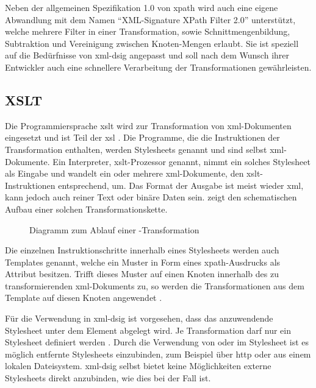 Neben der allgemeinen Spezifikation 1.0 von \gls{xpath} \cite{xpath:w3c} wird auch eine eigene Abwandlung mit dem Namen "`XML-Signature XPath Filter 2.0"'
\cite{xml-dsig-filter:w3c} unterstützt, welche mehrere Filter in einer Transformation, sowie Schnittmengenbildung, Subtraktion und Vereinigung zwischen
Knoten-Mengen erlaubt. Sie ist speziell auf die Bedürfnisse von \gls{xml-dsig} angepasst und soll nach dem Wunsch ihrer Entwickler auch eine schnellere
Verarbeitung der Transformationen gewährleisten.



\subsection{XSLT}
\label{sec:XML-DSig:Transformationen:XSLT}
Die Programmiersprache \gls{xslt} wird zur Transformation von \gls{xml}-Dokumenten eingesetzt und ist Teil der \gls{xsl} \cite{xml:oreilly}. Die Programme, die
die Instruktionen der Transformation enthalten, werden Stylesheets genannt und sind selbst \gls{xml}-Dokumente. Ein Interpreter, \gls{xslt}-Prozessor genannt,
nimmt ein solches Stylesheet als Eingabe und wandelt ein oder mehrere \gls{xml}-Dokumente, den \gls{xslt}-Instruktionen entsprechend, um. Das Format der Ausgabe ist
meist wieder \gls{xml}, kann jedoch auch reiner Text oder binäre Daten sein.  zeigt den schematischen Aufbau einer solchen
Transformationskette.

\begin{figure}
    \centering
    
    \caption{Diagramm zum Ablauf einer \texorpdfstring{\protect{}}{XSLT}-Transformation}
    \label{fig:xslt-processing}
\end{figure}

Die einzelnen Instruktionschritte innerhalb eines Stylesheets werden auch Templates genannt, welche ein Muster in Form eines \gls{xpath}-Ausdrucks als Attribut besitzen. 
Trifft dieses Muster auf einen Knoten innerhalb des zu transformierenden \gls{xml}-Dokuments zu, so werden die Transformationen  aus dem Template auf diesen Knoten 
angewendet \cite{xslt:w3c,xml:oreilly}.

Für die Verwendung in \gls{xml-dsig} ist vorgesehen, dass das anzuwendende Stylesheet unter dem Element  abgelegt wird.
Je Transformation darf nur ein Stylesheet definiert werden \cite{xml-dsig:w3c}. Durch die Verwendung von  oder  im
Stylesheet ist es möglich entfernte Stylesheets einzubinden, zum Beispiel über \gls{http} oder aus einem lokalen Dateisystem. \gls{xml-dsig} selbst bietet keine
Möglichkeiten externe Stylesheets direkt anzubinden, wie dies bei  der Fall ist. 

